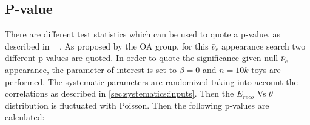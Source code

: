 
\subsection {P-value}
\label{sec:pvalue_nuebarapp}


There are different test statistics which can be used to quote a p-value,
as described in 
~\cite{slides_davide_pvalue_asg} %
.
As proposed by the OA group, for this $\bar{\nu}_e$ appearance search two different p-values are quoted.
In order to quote the significance given null $\bar{\nu}_e$ appearance, the parameter of interest is set to $\beta=0$
and $n=10k$ toys are performed.
The systematic parameters are randomized taking into account the correlations as described in \cref{sec:systematics:inputs}.
Then the $E_{reco}$ Vs $\theta$ distribution is fluctuated with Poisson. 
Then the following p-values are calculated:
